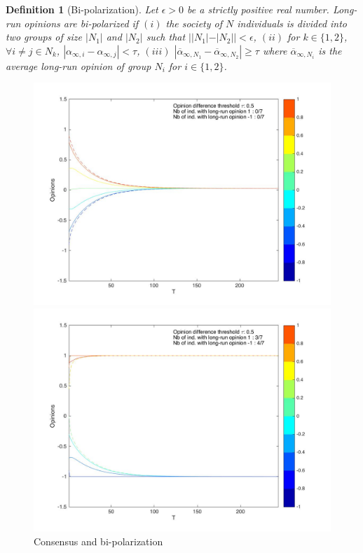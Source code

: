 \documentclass{article}
\newtheorem{definition}{Definition}
\begin{document}
\begin{definition}[Bi-polarization]
Let $\epsilon >0$ be a strictly positive real number. Long-run opinions are bi-polarized if $(i)$ the society of $N$ individuals is divided into two groups of size $|N_1|$ and $|N_2|$ such that $||N_1| - |N_2| |< \epsilon$, $(ii)$ for $k \in \{ 1,2 \}$, $\forall i \neq j \in N_k$, $|\alpha_{\infty,i} - \alpha_{\infty,j}| < \tau $, $(iii)$ $|\overline{\alpha}_{\infty,N_1} - \overline{\alpha}_{\infty,N_2}| \geq \tau $ where $\overline{\alpha}_{\infty,N_i}$ is the average long-run opinion of group $N_i$ for $i \in \{1,2 \}$. 
 \label{defbipolarization}
 \end{definition}

\begin{figure}
\centering
  \label{ fig7} 
  \hspace{-1.9cm}
  \begin{minipage}[c]{0.55\textwidth}
    \centering
    \includegraphics[scale=0.22]{img/consline.jpg} 
  \end{minipage}%
  \begin{minipage}[c]{0.4\textwidth}
    \centering
    \includegraphics[scale=0.22]{img/consline2.jpg} 
  \end{minipage} 
  \caption{Consensus and bi-polarization}
  \label{cons_line}
  \end{figure}
  
\end{document}
